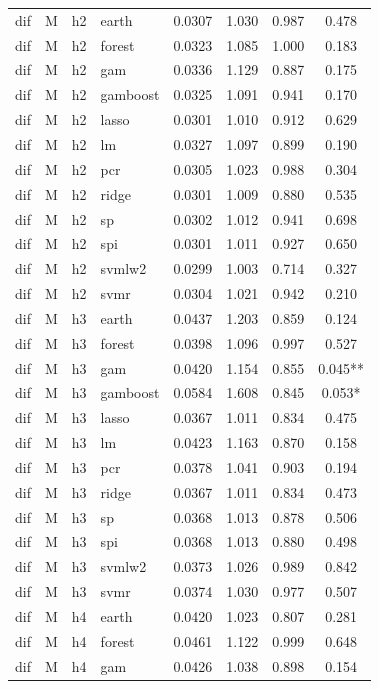 \begin{ThreePartTable}
\begin{longtable}[t]{llclcccc}
\addlinespace
dif & M & h2 & earth & 0.0307 & 1.030 & 0.987 & 0.478\\
dif & M & h2 & forest & 0.0323 & 1.085 & 1.000 & 0.183\\
dif & M & h2 & gam & 0.0336 & 1.129 & 0.887 & 0.175\\
dif & M & h2 & gamboost & 0.0325 & 1.091 & 0.941 & 0.170\\
dif & M & h2 & lasso & 0.0301 & 1.010 & 0.912 & 0.629\\
dif & M & h2 & lm & 0.0327 & 1.097 & 0.899 & 0.190\\
dif & M & h2 & pcr & 0.0305 & 1.023 & 0.988 & 0.304\\
dif & M & h2 & ridge & 0.0301 & 1.009 & 0.880 & 0.535\\
dif & M & h2 & sp & 0.0302 & 1.012 & 0.941 & 0.698\\
dif & M & h2 & spi & 0.0301 & 1.011 & 0.927 & 0.650\\
dif & M & h2 & svmlw2 & 0.0299 & 1.003 & 0.714 & 0.327\\
dif & M & h2 & svmr & 0.0304 & 1.021 & 0.942 & 0.210\\
\addlinespace
dif & M & h3 & earth & 0.0437 & 1.203 & 0.859 & 0.124\\
dif & M & h3 & forest & 0.0398 & 1.096 & 0.997 & 0.527\\
dif & M & h3 & gam & 0.0420 & 1.154 & 0.855 & 0.045**\\
dif & M & h3 & gamboost & 0.0584 & 1.608 & 0.845 & 0.053*\\
dif & M & h3 & lasso & 0.0367 & 1.011 & 0.834 & 0.475\\
dif & M & h3 & lm & 0.0423 & 1.163 & 0.870 & 0.158\\
dif & M & h3 & pcr & 0.0378 & 1.041 & 0.903 & 0.194\\
dif & M & h3 & ridge & 0.0367 & 1.011 & 0.834 & 0.473\\
dif & M & h3 & sp & 0.0368 & 1.013 & 0.878 & 0.506\\
dif & M & h3 & spi & 0.0368 & 1.013 & 0.880 & 0.498\\
dif & M & h3 & svmlw2 & 0.0373 & 1.026 & 0.989 & 0.842\\
dif & M & h3 & svmr & 0.0374 & 1.030 & 0.977 & 0.507\\
\addlinespace
dif & M & h4 & earth & 0.0420 & 1.023 & 0.807 & 0.281\\
dif & M & h4 & forest & 0.0461 & 1.122 & 0.999 & 0.648\\
dif & M & h4 & gam & 0.0426 & 1.038 & 0.898 & 0.154\\

\end{longtable}
\end{ThreePartTable}
